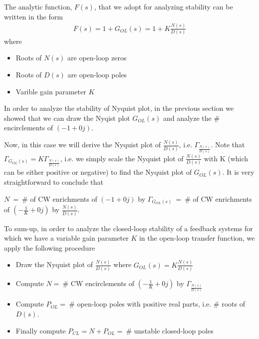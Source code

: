 \documentclass[twoside]{article}
\begin{document}
The analytic function, $F(s)$, that we adopt for analyzing stability 
can be written in the form  
%
\begin{align*}
  F(s) = 1 + G_{OL}(s) = 1 + K \frac{ N(s) }{ D(s) } 
\end{align*}
%
where 
\begin{itemize}
  \item Roots of $N(s)$ are open-loop zeros
  \item Roots of $D(s)$ are open-loop poles
  \item Varible gain parameter $K$
\end{itemize}
%
In order to analyze the stability of Nyquist plot,
in the previous section we showed that 
we can draw the Nyqist plot $G_{OL}(s)$
and analyze the $\#$ encirclements of $(-1 + 0 j)$.

Now, in this case we will derive the Nyquist plot of 
$\frac{N(s)}{D(s)}$, i.e. $\Gamma_{\frac{N(s)}{D(s)}}$. 
Note that $\Gamma_{G_{OL}(s)} = K \Gamma_{\frac{N(s)}{D(s)}}$,
i.e. we simply scale the Nyquist plot of $\frac{N(s)}{D(s)}$
with K (which can be either positive or negative) to find the
Nyquist plot of $G_{OL}(s)$. It is very straightforward to
conclude that 

\vspace{6 pt}

$N \ = \ \#$ of CW enrichments of $(-1 + 0 j)$ by  $\Gamma_{G_{OL}(s)} \
= \ \#$ of CW enrichments of $\left( -\frac{1}{K} + 0 j \right)$ by  $\frac{N(s)}{D(s)}$.

\vspace{6 pt}

To sum-up, in order to analyze the closed-loop stability of a 
feedback systems for which we have a variable gain parameter $K$ in
the open-loop transfer function, we apply the following 
procedure 

\begin{itemize}
 \item Draw the Nyquist plot of $\frac{N(s)}{D(s)}$ where $G_{OL}(s) =
   K \frac{N(s)}{D(s)}$
 \item Compute $N = \ \#$ CW encirclements of $\left( -\frac{1}{K}  + 0 j \right)$ by
   $\Gamma_{ \frac{N(s)}{D(s)} }$ 
 \item Compute $P_{OL} = \ \#$ open-loop poles with
   positive real parts, i.e. $\#$ roots of $D(s)$.
 \item Finally compute $P_{CL} = N +  P_{OL} = \ \#$
   unstable closed-loop poles  
\end{itemize}
\end{document}
